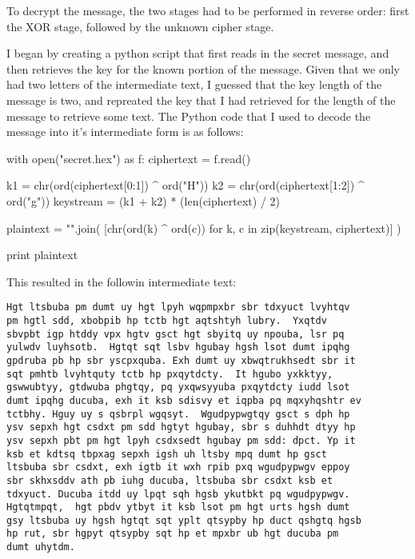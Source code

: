 \documentclass[12pt,a4paper,twoside]{article}
\begin{document}
To decrypt the message, the two stages had to be performed in reverse order:
first the XOR stage, followed by the unknown cipher stage. 

I began by creating a python script that first reads in the secret message, and
then retrieves the key for the known portion of the message. Given that we only
had two letters of the intermediate text, I guessed that the key length of the
message is two, and repreated the key that I had retrieved for the length of
the message to retrieve some text. The Python code that I used to decode the
message into it's intermediate form is as follows:

\begin{python}
with open("secret.hex") as f:
    ciphertext = f.read()

    k1 = chr(ord(ciphertext[0:1]) ^ ord("H"))
    k2 = chr(ord(ciphertext[1:2]) ^ ord("g"))
    keystream = (k1 + k2) * (len(ciphertext) / 2)

    plaintext = "".join(
            [chr(ord(k) ^ ord(c)) 
             for k, c in zip(keystream, ciphertext)]
    )

    print plaintext
\end{python}

This resulted in the followin intermediate text: 

\begin{lstlisting}
Hgt ltsbuba pm dumt uy hgt lpyh wqpmpxbr sbr tdxyuct lvyhtqv
pm hgtl sdd, xbobpib hp tctb hgt aqtshtyh lubry.  Yxqtdv
sbvpbt igp htddy vpx hgtv gsct hgt sbyitq uy npouba, lsr pq
yulwdv luyhsotb.  Hgtqt sqt lsbv hgubay hgsh lsot dumt ipqhg
gpdruba pb hp sbr yscpxquba. Exh dumt uy xbwqtrukhsedt sbr it
sqt pmhtb lvyhtquty tctb hp pxqytdcty.  It hgubo yxkktyy,
gswwubtyy, gtdwuba phgtqy, pq yxqwsyyuba pxqytdcty iudd lsot
dumt ipqhg ducuba, exh it ksb sdisvy et iqpba pq mqxyhqshtr ev
tctbhy. Hguy uy s qsbrpl wgqsyt.  Wgudpypwgtqy gsct s dph hp
ysv sepxh hgt csdxt pm sdd hgtyt hgubay, sbr s duhhdt dtyy hp
ysv sepxh pbt pm hgt lpyh csdxsedt hgubay pm sdd: dpct. Yp it
ksb et kdtsq tbpxag sepxh igsh uh ltsby mpq dumt hp gsct
ltsbuba sbr csdxt, exh igtb it wxh rpib pxq wgudpypwgv eppoy
sbr skhxsddv ath pb iuhg ducuba, ltsbuba sbr csdxt ksb et
tdxyuct. Ducuba itdd uy lpqt sqh hgsb ykutbkt pq wgudpypwgv.
Hgtqtmpqt,  hgt pbdv ytbyt it ksb lsot pm hgt urts hgsh dumt
gsy ltsbuba uy hgsh hgtqt sqt yplt qtsypby hp duct qshgtq hgsb
hp rut, sbr hgpyt qtsypby sqt hp et mpxbr ub hgt ducuba pm
dumt uhytdm.
\end{lstlisting}
\end{document}
